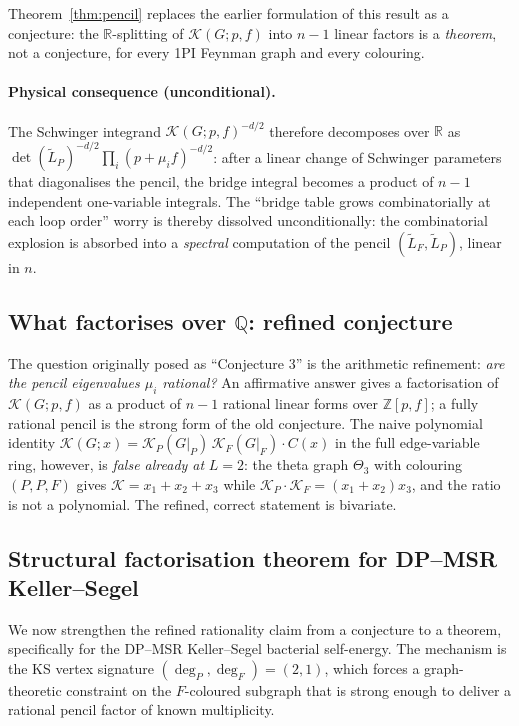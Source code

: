 \documentclass[11pt,a4paper]{article}
\theoremstyle{plain}
\begin{document}
Theorem~\ref{thm:pencil} replaces the earlier formulation of this
result as a conjecture: the $\mathbb{R}$-splitting of
$\mathcal{K}(G;p,f)$ into $n{-}1$ linear factors is a
\emph{theorem}, not a conjecture, for every 1PI Feynman graph and
every colouring.

\paragraph{Physical consequence (unconditional).}
The Schwinger integrand $\mathcal{K}(G;p,f)^{-d/2}$ therefore
decomposes over $\mathbb{R}$ as
$\det(\widetilde L_P)^{-d/2} \prod_i (p + \mu_i f)^{-d/2}$:
after a linear change of Schwinger parameters that diagonalises
the pencil, the bridge integral becomes a product of $n{-}1$
independent one-variable integrals.  The ``bridge table grows
combinatorially at each loop order'' worry is thereby dissolved
unconditionally: the combinatorial explosion is absorbed into a
\emph{spectral} computation of the pencil $(\widetilde L_F, \widetilde L_P)$,
linear in $n$.

\subsection{What factorises over $\mathbb{Q}$: refined conjecture}

The question originally posed as ``Conjecture 3'' is the
arithmetic refinement: \emph{are the pencil eigenvalues
$\mu_i$ rational?}  An affirmative answer gives a factorisation
of $\mathcal{K}(G;p,f)$ as a product of $n{-}1$ rational linear
forms over $\mathbb{Z}[p,f]$; a fully rational pencil is the
strong form of the old conjecture.  The naive polynomial identity
$\mathcal{K}(G;x) = \mathcal{K}_P(G|_P)\,\mathcal{K}_F(G|_F)\cdot C(x)$
in the full edge-variable ring, however, is \emph{false already
at} $L = 2$: the theta graph $\Theta_3$ with colouring $(P,P,F)$
gives $\mathcal{K} = x_1 + x_2 + x_3$ while $\mathcal{K}_P\cdot
\mathcal{K}_F = (x_1 + x_2)x_3$, and the ratio is not a polynomial.
The refined, correct statement is bivariate.

\subsection{Structural factorisation theorem for DP--MSR Keller--Segel}

We now strengthen the refined rationality claim from a conjecture
to a theorem, specifically for the DP--MSR Keller--Segel bacterial
self-energy.  The mechanism is the KS vertex signature $(\deg_P,
\deg_F) = (2, 1)$, which forces a graph-theoretic constraint on
the $F$-coloured subgraph that is strong enough to deliver a
rational pencil factor of known multiplicity.
\end{document}
